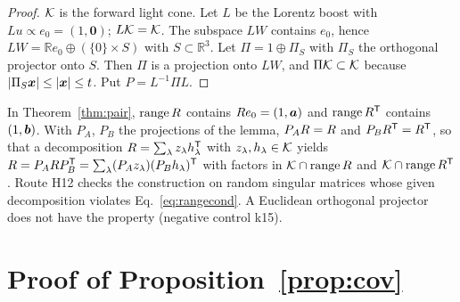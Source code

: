 \begin{proof}
$\mathcal{K}$ is the forward light cone. Let $L$ be the Lorentz boost with $Lu\propto e_0=(1,\bm{0})$; $L\mathcal{K}=\mathcal{K}$. The subspace $LW$ contains $e_0$, hence $LW=\mathbb{R}e_0\oplus(\{0\}\times S)$ with $S\subset\mathbb{R}^3$. Let $\Pi=1\oplus\Pi_S$ with $\Pi_S$ the orthogonal projector onto $S$. Then $\Pi$ is a projection onto $LW$, and $\Pi\mathcal{K}\subset\mathcal{K}$ because $|\Pi_S\bm{x}|\le|\bm{x}|\le t$. Put $P=L^{-1}\Pi L$.
\end{proof}

In Theorem~\ref{thm:pair}, $\operatorname{range}R$ contains $R e_0=(1,\bm{a})$ and $\operatorname{range}R^{\mathsf{T}}$ contains $(1,\bm{b})$. With $P_A$, $P_B$ the projections of the lemma, $P_AR=R$ and $P_BR^{\mathsf{T}}=R^{\mathsf{T}}$, so that a decomposition $R=\sum_\lambda z_\lambda h_\lambda^{\mathsf{T}}$ with $z_\lambda,h_\lambda\in\mathcal{K}$ yields $R=P_AR P_B^{\mathsf{T}}=\sum_\lambda(P_Az_\lambda)(P_Bh_\lambda)^{\mathsf{T}}$ with factors in $\mathcal{K}\cap\operatorname{range}R$ and $\mathcal{K}\cap\operatorname{range}R^{\mathsf{T}}$. Route H12 checks the construction on random singular matrices whose given decomposition violates Eq.~\eqref{eq:rangecond}. A Euclidean orthogonal projector does not have the property (negative control k15).

\section{Proof of Proposition~\ref{prop:cov}}
\label{app:cov}

